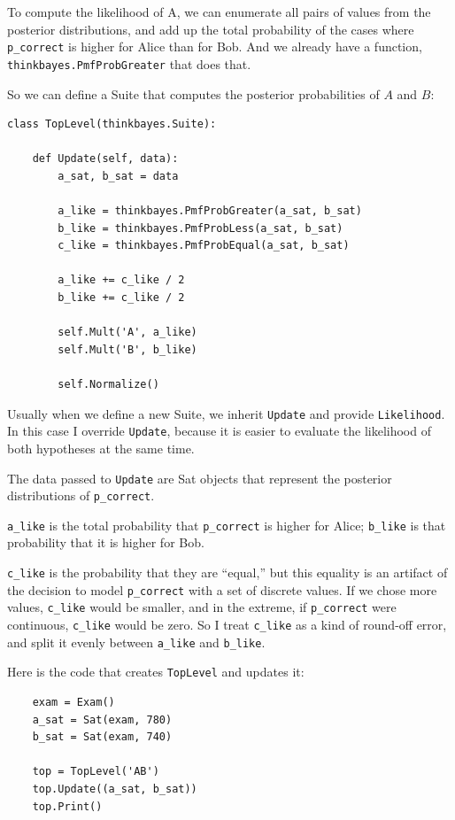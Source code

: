 \documentclass[12pt]{book}
\begin{document}
To compute the likelihood of A, we can enumerate all pairs of values
from the posterior distributions, and add up the total probability of
the cases where \verb"p_correct" is higher for Alice than for Bob.
And we already have a function, \verb"thinkbayes.PmfProbGreater"
that does that.

So we can define a Suite that computes the posterior probabilities
of $A$ and $B$:

\begin{verbatim}
class TopLevel(thinkbayes.Suite):

    def Update(self, data):
        a_sat, b_sat = data

        a_like = thinkbayes.PmfProbGreater(a_sat, b_sat)
        b_like = thinkbayes.PmfProbLess(a_sat, b_sat)
        c_like = thinkbayes.PmfProbEqual(a_sat, b_sat)

        a_like += c_like / 2
        b_like += c_like / 2

        self.Mult('A', a_like)
        self.Mult('B', b_like)

        self.Normalize()
\end{verbatim}

Usually when we define a new Suite, we inherit {\tt Update}
and provide {\tt Likelihood}.  In this case I override {\tt Update},
because it is easier to evaluate the likelihood of both
hypotheses at the same time.

The data passed to {\tt Update} are Sat objects that represent
the posterior distributions of \verb"p_correct".

\verb"a_like" is the total probability that
\verb"p_correct" is higher for Alice; \verb"b_like" is that
probability that it is higher for Bob.

\verb"c_like" is the probability that they are ``equal,'' but this
equality is an artifact of the decision to model \verb"p_correct" with
a set of discrete values.  If we chose more values, \verb"c_like"
would be smaller, and in the extreme, if \verb"p_correct" were
continuous, \verb"c_like" would be zero.  So I treat \verb"c_like" as
a kind of round-off error, and split it evenly between \verb"a_like"
and \verb"b_like".

Here is the code that creates {\tt TopLevel} and updates it:

\begin{verbatim}
    exam = Exam()
    a_sat = Sat(exam, 780)
    b_sat = Sat(exam, 740)

    top = TopLevel('AB')
    top.Update((a_sat, b_sat))
    top.Print()
\end{verbatim}
\end{document}
